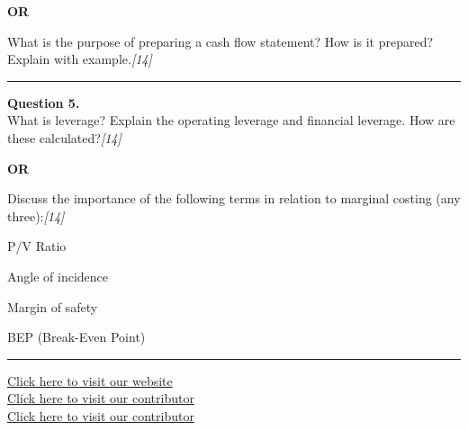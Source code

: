 \documentclass[11pt,a4paper]{article}
\newcommand{\pts}[1]{\hfill   \textit{[#1]}}
\begin{document}
\centerline{   \textbf{OR}}

What is the purpose of preparing a cash flow statement? How is it prepared? Explain with example.\pts{14}

\medskip\rule{\linewidth}{0.2pt}




\noindent   \textbf{Question 5.} \\
What is leverage? Explain the operating leverage and financial leverage. How are these calculated?\pts{14}

\centerline{   \textbf{OR}}

Discuss the importance of the following terms in relation to marginal costing (any three):\pts{14}

\begin{parts}
  \item P/V Ratio
  \item Angle of incidence
  \item Margin of safety
  \item BEP (Break-Even Point)
\end{parts}

\vfill
\rule{\linewidth}{0.4pt}

\begin{center}\small
  \href{https://bhu-exam.vercel.app/}{Click here to visit our website}\\[4pt]
  \href{https://me-aryan.vercel.app/}{Click here to visit our contributor}\\[4pt]
  \href{https://quashan-me.vercel.app/}{Click here to visit our contributor}
\end{center}
\end{document}
